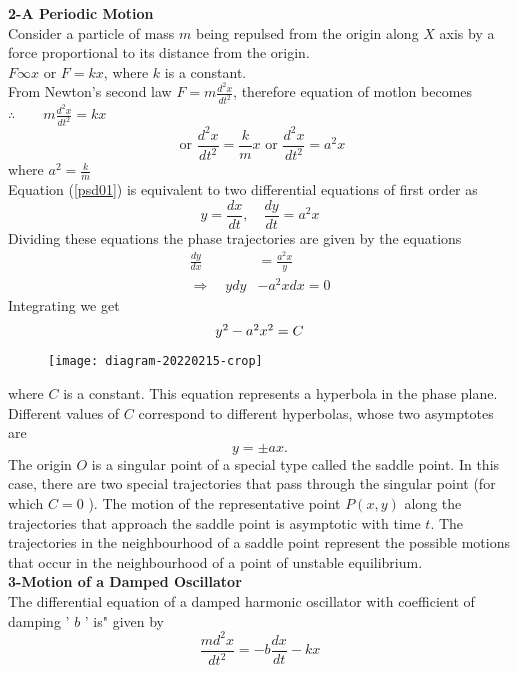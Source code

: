 \textbf{2-A Periodic Motion}\\
Consider a particle of mass $m$ being repulsed from the origin along $X$ axis by a force proportional to its distance from the origin.\\
$F \infty x$ or $F=k x$, where $k$ is a constant.\\
From Newton's second law $F=m \frac{d^{2} x}{d t^{2}}$, therefore equation of motlon becomes\\
$\therefore \qquad m \frac{d^{2} x}{d t^{2}}=k x $\\
\begin{equation}
\text { or }  \frac{d^{2} x}{d t^{2}}=\frac{k}{m} x \text { or } \frac{d^{2} x}{d t^{2}}=a^{2} x\label{psd01}
\end{equation}
where \qquad
$a^{2}=\frac{k}{m}$\\
Equation (\ref{psd01}) is equivalent to two differential equations of first order as
$$
y=\frac{d x}{d t}, \quad \frac{d y}{d t}=a^{2} x
$$
Dividing these equations the phase trajectories are given by the equations
$$
\begin{aligned}
\frac{d y}{d x} &=\frac{a^{2} x}{y} \\
\Rightarrow \quad y d y &-a^{2} x d x=0
\end{aligned}
$$
Integrating we get
\begin{equation}
$$
y^{2}-a^{2} x^{2}=C
$$
\end{equation}
\begin{figure}[H]
	\centering
	\texttt{[image: diagram-20220215-crop]}
\end{figure}
where $C$ is a constant. This equation represents a hyperbola in the phase plane. Different values of $C$ correspond to different hyperbolas, whose two asymptotes are
$$
y=\pm a x .
$$
The origin $O$ is a singular point of a special type called the saddle point. In this case, there are two special trajectories that pass through the singular point (for which $C=0$ ). The motion of the representative point $P(x, y)$ along the trajectories that approach the saddle point is asymptotic with time $t$. The trajectories in the neighbourhood of a saddle point represent the possible motions that occur in the neighbourhood of a point of unstable equilibrium.\\
\textbf{3-Motion of a Damped Oscillator}\\
The differential equation of a damped harmonic oscillator with coefficient of damping ' $b$ ' is" given by
$$
\frac{m d^{2} x}{d t^{2}}=-b \frac{d x}{d t}-k x
$$
